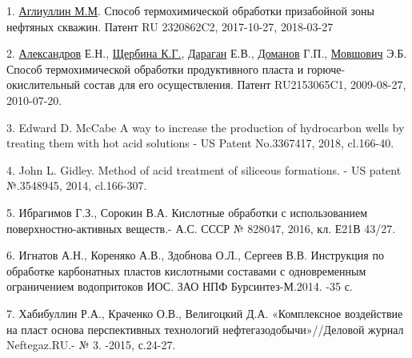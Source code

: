 \begin{refs}
1. \href{https://patents.google.com/?assignee=\%D0\%90\%D0\%B3\%D0\%BB\%D0\%B8\%D1\%83\%D0\%BB\%D0\%BB\%D0\%B8\%D0\%BD+\%D0\%9C\%D0\%B8\%D0\%BD\%D1\%82\%D0\%B0\%D0\%BB\%D0\%B8\%D0\%BF+\%D0\%9C\%D0\%B8\%D0\%BD\%D0\%B3\%D0\%B0\%D0\%BB\%D0\%B5\%D0\%B5\%D0\%B2\%D0\%B8\%D1\%87&peid=62a579286f398\%3A769\%3A84d87e1b}{Аглиуллин
М.М}. Способ термохимической обработки призабойной зоны нефтяных
скважин. Патент RU 2320862C2, 2017-10-27, 2018-03-27

2. \href{https://patents.google.com/?inventor=\%D0\%95.\%D0\%9D.(RU)+\%D0\%90\%D0\%BB\%D0\%B5\%D0\%BA\%D1\%81\%D0\%B0\%D0\%BD\%D0\%B4\%D1\%80\%D0\%BE\%D0\%B2&peid=62a58a8975e88\%3Ad5\%3A37969d2b}{Александров}
Е.Н.,
\href{https://patents.google.com/?inventor=\%D0\%9A\%D0\%B0\%D1\%80\%D0\%B8\%D0\%BD\%D0\%B0+\%D0\%93\%D1\%80\%D0\%B8\%D0\%B3\%D0\%BE\%D1\%80\%D1\%8C\%D0\%B5\%D0\%B2\%D0\%BD\%D0\%B0+\%D0\%A9\%D0\%B5\%D1\%80\%D0\%B1\%D0\%B8\%D0\%BD\%D0\%B0+(UA)&peid=62a58a8534108\%3Ad3\%3Ab282e17c}{Щербина
К.Г.},
\href{https://patents.google.com/?inventor=\%D0\%95.\%D0\%92.(RU)+\%D0\%94\%D0\%B0\%D1\%80\%D0\%B0\%D0\%B3\%D0\%B0\%D0\%BD&peid=62a58a851ba68\%3Ad2\%3Aa8a96fee}{Дараган}
Е.В.,
\href{https://patents.google.com/?inventor=\%D0\%93.\%D0\%9F.(RU)+\%D0\%94\%D0\%BE\%D0\%BC\%D0\%B0\%D0\%BD\%D0\%BE\%D0\%B2&peid=62a58a84c28a0\%3Ad0\%3Afb85d5a3}{Доманов}
Г.П.,
\href{https://patents.google.com/?inventor=\%D0\%AD.\%D0\%91.(RU)+\%D0\%9C\%D0\%BE\%D0\%B2\%D1\%88\%D0\%BE\%D0\%B2\%D0\%B8\%D1\%87&peid=62a58a7ec2e50\%3Aca\%3A10c64ab3}{Мовшович}
Э.Б. Способ термохимической обработки продуктивного пласта и
горюче-окислительный состав для его осуществления. Патент RU2153065C1,
2009-08-27, 2010-07-20.

3. Edward D. McCabe A way to increase the production of hydrocarbon
wells by treating them with hot acid solutions - US Patent No.3367417,
2018, cl.166-40.

4. John L. Gidley. Method of acid treatment of siliceous formations. -
US patent №.3548945, 2014, cl.166-307.

5. Ибрагимов Г.З., Сорокин В.А. Кислотные обработки с использованием
поверхностно-активных веществ.- А.С. СССР № 828047, 2016, кл. Е21В
43/27.

6. Игнатов А.Н., Кореняко А.В., Здобнова О.Л., Сергеев В.В. Инструкция
по обработке карбонатных пластов кислотными составами с одновременным
ограничением водопритоков ИОС. ЗАО НПФ Бурсинтез-М.2014. -35 с.

7. Хабибуллин Р.А., Краченко О.В., Велигоцкий Д.А. «Комплексное
воздействие на пласт основа перспективных технологий
нефтегазодобычи»//Деловой журнал Neftegaz.RU.- № 3. -2015, с.24-27.


\end{refs}
